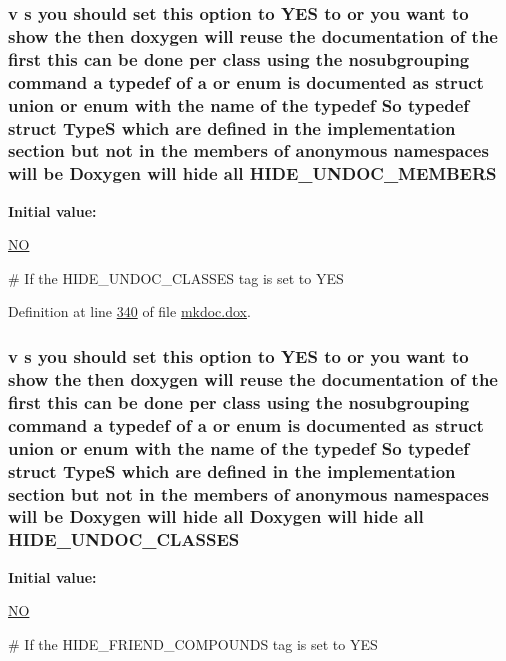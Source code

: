 \hypertarget{mkdoc_8dox_aa8c460aa75e1350ef6bebbac97c2aeff}{
\subsubsection[{H\-I\-D\-E\-\_\-\-U\-N\-D\-O\-C\-\_\-\-M\-E\-M\-B\-E\-R\-S}]{\setlength{\rightskip}{0pt plus 5cm}v s you should set this option to Y\-E\-S to or you want to show the then doxygen will reuse the documentation of the first this can be done per class using the nosubgrouping command a typedef of a or enum is documented as {\bf struct} {\bf union} or enum with the name of the typedef So typedef {\bf struct} {\bf Type\-S} which {\bf are} defined in the implementation section but not in the members of anonymous namespaces will be Doxygen will hide all H\-I\-D\-E\-\_\-\-U\-N\-D\-O\-C\-\_\-\-M\-E\-M\-B\-E\-R\-S}}\label{mkdoc_8dox_aa8c460aa75e1350ef6bebbac97c2aeff}
{\bfseries Initial value\-:}
\begin{DoxyCode}
 \hyperlink{mkdoc_8dox_a0f6a46245280dc38baf9600906aa1393}{NO}

\textcolor{preprocessor}{# If the HIDE\_UNDOC\_CLASSES tag is set to YES}
\end{DoxyCode}


Definition at line \hyperlink{mkdoc_8dox_source_l00340}{340} of file \hyperlink{mkdoc_8dox_source}{mkdoc.\-dox}.

\hypertarget{mkdoc_8dox_a52efc4dfca6b18ed1ee0590d32cbbe76}{
\subsubsection[{H\-I\-D\-E\-\_\-\-U\-N\-D\-O\-C\-\_\-\-C\-L\-A\-S\-S\-E\-S}]{\setlength{\rightskip}{0pt plus 5cm}v s you should set this option to Y\-E\-S to or you want to show the then doxygen will reuse the documentation of the first this can be done per class using the nosubgrouping command a typedef of a or enum is documented as {\bf struct} {\bf union} or enum with the name of the typedef So typedef {\bf struct} {\bf Type\-S} which {\bf are} defined in the implementation section but not in the members of anonymous namespaces will be Doxygen will hide all Doxygen will hide all H\-I\-D\-E\-\_\-\-U\-N\-D\-O\-C\-\_\-\-C\-L\-A\-S\-S\-E\-S}}\label{mkdoc_8dox_a52efc4dfca6b18ed1ee0590d32cbbe76}
{\bfseries Initial value\-:}
\begin{DoxyCode}
 \hyperlink{mkdoc_8dox_a0f6a46245280dc38baf9600906aa1393}{NO}

\textcolor{preprocessor}{# If the HIDE\_FRIEND\_COMPOUNDS tag is set to YES}
\end{DoxyCode}


